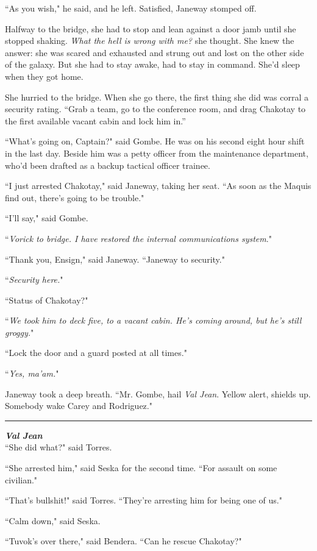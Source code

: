 \documentclass[twoside,letterpaper,12pt]{memoir}
\begin{document}
``As you wish," he said, and he left. Satisfied, Janeway stomped off.

Halfway to the bridge, she had to stop and lean against a door jamb until she stopped shaking. \textit{What the hell is wrong with me?} she thought. She knew the answer: she was scared and exhausted and strung out and lost on the other side of the galaxy. But she had to stay awake, had to stay in command. She'd sleep when they got home.

She hurried to the bridge. When she go there, the first thing she did was corral a security rating. ``Grab a team, go to the conference room, and drag Chakotay to the first available vacant cabin and lock him in.''

``What's going on, Captain?" said Gombe. He was on his second eight hour shift in the last day. Beside him was a petty officer from the maintenance department, who'd been drafted as a backup tactical officer trainee.

``I just arrested Chakotay," said Janeway, taking her seat. ``As soon as the Maquis find out, there's going to be trouble."

``I'll say," said Gombe.

``\textit{Vorick to bridge. I have restored the internal communications system}."

``Thank you, Ensign," said Janeway. ``Janeway to security."

``\textit{Security here.}"

``Status of Chakotay?"

``\textit{We took him to deck five, to a vacant cabin. He’s coming around, but he’s still groggy.}"

``Lock the door and a guard posted at all times."

``\textit{Yes, ma'am.}"

Janeway took a deep breath. ``Mr. Gombe, hail \textit{Val Jean}. Yellow alert, shields up. Somebody wake Carey and Rodriguez."

\fancybreak{\rule{3cm}{0.4 pt}}
\noindent\textit{\textbf{Val Jean}}\\

``She did what?" said Torres.

``She arrested him," said Seska for the second time. ``For assault on some civilian."

``That's bullshit!" said Torres. ``They're arresting him for being one of us."

``Calm down," said Seska.

``Tuvok's over there," said Bendera. ``Can he rescue Chakotay?"
\end{document}
